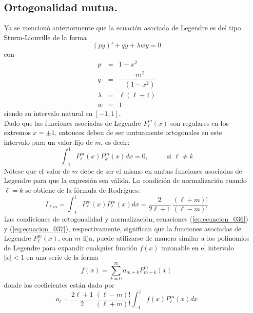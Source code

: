 \subsection*{Ortogonalidad mutua.}
Ya se mencionó anteriormente que la ecuación asociada de Legendre es del tipo Sturm-Liouville de la forma
\[ (py)' + qy + \lambda w y = 0 \]
con
\begin{eqnarray}
p &=& 1 - x^{2} \nonumber \\
q &=& - \dfrac{m^{2}}{(1 - x^{2})} \nonumber \\
\lambda &=& \ell (\ell + 1) \nonumber \\
w &=& 1 \nonumber
\end{eqnarray}
siendo su intervalo natural en $[-1,1]$.
\\
Dado que las funciones asociadas de Legendre $P_{\ell}^{m} (x)$ son regulares en los extremos $x = \pm 1$, entonces deben de ser mutuamente ortogonales en este intervalo para un valor fijo de $m$, es decir:
\begin{equation}
\int_{-1}^{1} P_{\ell}^{m} (x) P_{k}^{m} (x) dx  = 0, \hspace{1cm} \mbox{ si } \ell \neq	 k
\label{eq:ecuacion_036}
\end{equation}
Nótese que el valor de $m$ debe de ser el mismo en ambas funciones asociadas de Legendre para que la expresión sea válida. La condición de normalización cuando $\ell = k$ se obtiene de la fórmula de Rodrigues:
\begin{equation}
I_{\ell m} = \int_{-1}^{1} P_{\ell}^{m} (x) P_{\ell}^{m} (x) dx = \dfrac{2}{2 \ell + 1}\: \dfrac{(\ell +m)!}{( \ell - m)!}
\label{eq:ecuacion_037}
\end{equation}
Las condiciones de ortogonalidad y normalización, ecuaciones (\ref{eq:ecuacion_036}) y (\ref{eq:ecuacion_037}), respectivamente, significan que la funciones asociadas de Legendre $P_{\ell}^{m}(x)$, con $m$ fija, puede utilizarse de  manera similar a los polinomios de Legendre para expandir cualquier función $f(x)$ razonable en el intervalo $\vert x \vert < 1$ en una serie de la forma
\begin{equation}
f(x) = \sum_{k=0}^{\infty} a_{m+k} P_{m+k}^{m} (x)
\label{eq:ecuacion_038}
\end{equation}
donde los coeficientes están dado por
\[ a_{\ell} = \dfrac{2 \ell + 1}{2} \: \dfrac{(\ell - m)!}{(\ell + m)!} \int_{-1}^{1} f(x) P_{\ell}^{m} (x) dx \]
